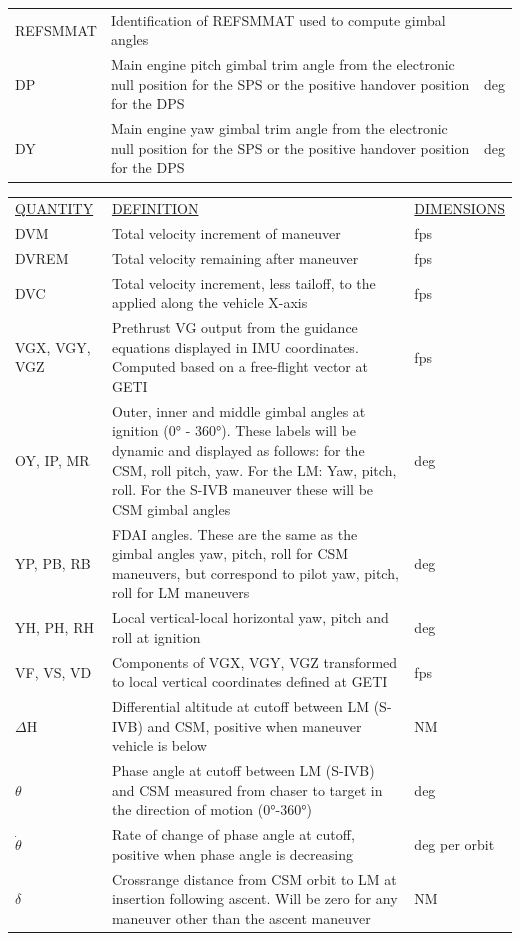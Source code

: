 \documentclass[11pt]{article} %
\begin{document}
\begin{center}
\begin{tabular}{ L{2.4cm} L{7.1cm} L{3cm} }
REFSMMAT&Identification of REFSMMAT used to compute gimbal angles&\\
DP&Main engine pitch gimbal trim angle from the electronic null position for the SPS or the positive handover position for the DPS&deg\\
DY&Main engine yaw gimbal trim angle from the electronic null position for the SPS or the positive handover position for the DPS&deg\\
\end{tabular}
\newpage
\begin{tabular}{ L{2.4cm} L{7.1cm} L{3cm} }
\underline{QUANTITY} & \underline{DEFINITION} & \underline{DIMENSIONS} \\
DVM&Total velocity increment of maneuver&fps\\
DVREM&Total velocity remaining after maneuver&fps\\
DVC&Total velocity increment, less tailoff, to the applied along the vehicle X-axis&fps\\
VGX, VGY, VGZ&Prethrust VG output from the guidance equations displayed in IMU coordinates. Computed based on a free-flight vector at GETI&fps\\
OY, IP, MR&Outer, inner and middle gimbal angles at ignition (0° - 360°). These labels will be dynamic and displayed as follows: for the CSM, roll pitch, yaw. For the LM: Yaw, pitch, roll. For the S-IVB maneuver these will be CSM gimbal angles&deg\\
YP, PB, RB&FDAI angles. These are the same as the gimbal angles yaw, pitch, roll for CSM maneuvers, but correspond to pilot yaw, pitch, roll for LM maneuvers&deg\\
YH, PH, RH&Local vertical-local horizontal yaw, pitch and roll at ignition&deg\\
VF, VS, VD&Components of VGX, VGY, VGZ transformed to local vertical coordinates defined at GETI&fps\\
$\Delta$H&Differential altitude at cutoff between LM (S-IVB) and CSM, positive when maneuver vehicle is below&NM\\
$\theta$&Phase angle at cutoff between LM (S-IVB) and CSM measured from chaser to target in the direction of motion (0°-360°)&deg\\
$\dot\theta$&Rate of change of phase angle at cutoff, positive when phase angle is decreasing&deg per orbit\\
$\delta$&Crossrange distance from CSM orbit to LM at insertion following ascent. Will be zero for any maneuver other than the ascent maneuver&NM\\

\end{tabular}
\end{center}
\end{document}
